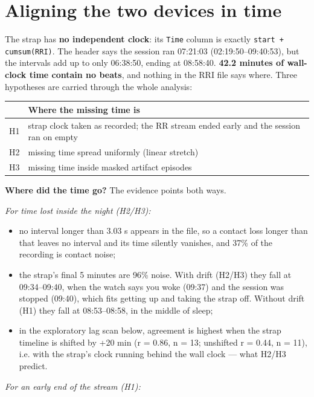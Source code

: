 \documentclass[11pt,a4paper]{article}
\begin{document}
\section{Aligning the two devices in time}\label{sec:aligning-the-two-devices-in-time}
The strap has \textbf{no independent clock}: its \texttt{Time} column is exactly \texttt{start + cumsum(RRI)}. The header says the session ran 07:21:03 (02:19:50–09:40:53), but the intervals add up to only 06:38:50, ending at 08:58:40. \textbf{42.2 minutes of wall-clock time contain no beats}, and nothing in the RRI file says where. Three hypotheses are carried through the whole analysis:

\begin{center}
\small
\begin{tabularx}{\linewidth}{lY}
\toprule
\textbf{} & \textbf{Where the missing time is} \\
\midrule
H1 & strap clock taken as recorded; the RR stream ended early and the session ran on empty \\
H2 & missing time spread uniformly (linear stretch) \\
H3 & missing time inside masked artifact episodes \\
\bottomrule
\end{tabularx}
\end{center}
\textbf{Where did the time go?} The evidence points both ways.

\emph{For time lost inside the night (H2/H3):}

\begin{itemize}
\item no interval longer than 3.03 s appears in the file, so a contact loss longer than that leaves no interval and its time silently vanishes, and 37\% of the recording is contact noise;
\item the strap's final 5 minutes are 96\% noise. With drift (H2/H3) they fall at 09:34–09:40, when the watch says you woke (09:37) and the session was stopped (09:40), which fits getting up and taking the strap off. Without drift (H1) they fall at 08:53–08:58, in the middle of sleep;
\item in the exploratory lag scan below, agreement is highest when the strap timeline is shifted by +20 min (r = 0.86, n = 13; unshifted r = 0.44, n = 11), i.e. with the strap's clock running behind the wall clock — what H2/H3 predict.
\end{itemize}
\emph{For an early end of the stream (H1):}
\end{document}
